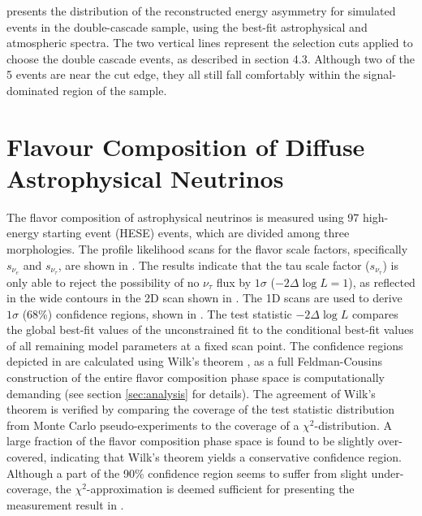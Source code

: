  presents the distribution of the reconstructed energy asymmetry for simulated events in the double-cascade sample, using the best-fit astrophysical and atmospheric spectra. The two vertical lines represent the selection cuts applied to choose the double cascade events, as described in section 4.3. Although two of the 5 events are near the cut edge, they all still fall comfortably within the signal-dominated region of the sample.

\section{Flavour Composition of Diffuse Astrophysical Neutrinos}
\label{sec:flavour_results}
The flavor composition of astrophysical neutrinos is measured using 97 high-energy starting event (HESE) events, which are divided among three morphologies. The profile likelihood scans for the flavor scale factors, specifically $s_{\nu_{e}}$ and $s_{\nu_{\tau}}$, are shown in . The results indicate that the tau scale factor ($s_{\nu_{\tau}}$) is only able to reject the possibility of no $\nu_{\tau}$ flux by $1\sigma$ ($-2\Delta \log L=1$), as reflected in the wide contours in the 2D scan shown in . The 1D scans are used to derive $1\sigma$ (68\%) confidence regions, shown in . The test statistic $-2\Delta \log L$ compares the global best-fit values of the unconstrained fit to the conditional best-fit values of all remaining model parameters at a fixed scan point. The confidence regions depicted in  are calculated using Wilk's theorem  , as a full Feldman-Cousins construction of the entire flavor composition phase space is computationally demanding (see section \ref{sec:analysis} for details). The agreement of Wilk's theorem is verified by comparing the coverage of the test statistic distribution from Monte Carlo pseudo-experiments to the coverage of a $\chi^2$-distribution. A large fraction of the flavor composition phase space is found to be slightly over-covered, indicating that Wilk's theorem yields a conservative confidence region. Although a part of the 90\% confidence region seems to suffer from slight under-coverage, the $\chi^2$-approximation is deemed sufficient for presenting the measurement result in . 
